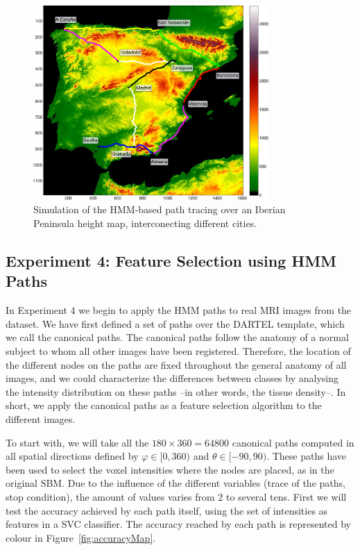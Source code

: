 \begin{figure}[htp]
	\myfloatalign
	\includegraphics[width=0.8\textwidth]{Graphics/ch6/spain.pdf}
	\caption{Simulation of the \ac{HMM}-based path tracing over an Iberian Peninsula height map, interconecting different cities.}
	\label{fig:spainmap}
\end{figure}

\subsection{Experiment 4: Feature Selection using \acs{HMM} Paths}
In Experiment 4 we begin to apply the \ac{HMM} paths to real \ac{MRI} images from the \adnimri{} dataset. We have first defined a set of paths over the DARTEL template, which we call the canonical paths. The canonical paths follow the anatomy of a normal subject to whom all other images have been registered. Therefore, the location of the different nodes on the paths are fixed throughout the general anatomy of all images, and we could characterize the differences between classes by analysing the intensity distribution on these paths --in other words, the tissue density--. In short, we apply the canonical paths as a feature selection algorithm to the different images. 

To start with, we will take all the $180\times360=64800$ canonical paths computed in all  spatial directions defined by $\varphi\in[0,360)$ and $\theta\in[-90,90)$. These paths have been used to select the voxel intensities where the nodes are placed, as in the original \ac{SBM}. Due to the influence of the different variables (trace of the paths, stop condition), the amount of values varies from 2 to several tens. First we will test the accuracy achieved by each path itself, using the set of intensities as features in a \ac{SVC} classifier. The accuracy reached by each path is represented by colour in Figure~\ref{fig:accuracyMap}. 

